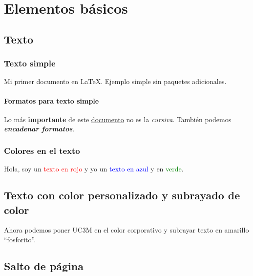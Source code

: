\chapter{Elementos básicos}
\label{ch:basics} %



\section{Texto}

\subsection{Texto simple}

Mi primer documento en \LaTeX. Ejemplo simple sin paquetes adicionales.


\subsubsection{Formatos para texto simple}

Lo más \textbf{importante} de este \underline{documento}
no es la \textit{cursiva}.
También podemos \textbf{\textit{encadenar formatos}}.


\subsection{Colores en el texto}

Hola, soy un \textcolor{red}{texto en rojo} y yo un \textcolor{blue}{texto en azul}
y en \textcolor{green}{verde}.


\section{Texto con color personalizado y subrayado de color}

Ahora podemos poner \textcolor{azulUC3M}{UC3M} en el color corporativo y
\colorbox{highlightYellow}{subrayar texto} en amarillo ``fosforito''.


\section{Salto de página}

